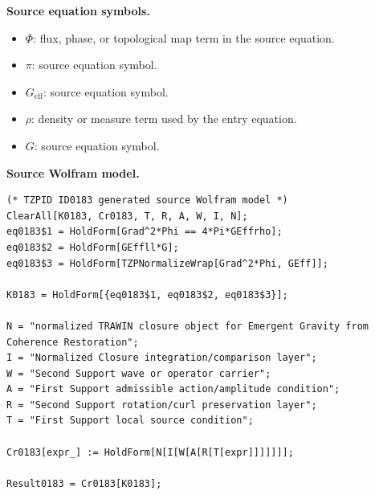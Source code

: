 \begin{minipage}[t]{0.49\linewidth}
\begingroup
\small
\raggedright
\textbf{Source equation symbols.}\par
\begin{itemize}[leftmargin=1.35em,itemsep=1pt,topsep=1pt,parsep=0pt]
    \item $\Phi$: flux, phase, or topological map term in the source equation.
    \item $\pi$: source equation symbol.
    \item $G_{\mathrm{eff}}$: source equation symbol.
    \item $\rho$: density or measure term used by the entry equation.
    \item $G$: source equation symbol.
\end{itemize}
\endgroup
\end{minipage}\hfill
\begin{minipage}[t]{0.47\linewidth}
\begingroup
\scriptsize
\raggedright
\textbf{Source Wolfram model.}\par
\begin{Verbatim}[fontsize=\tiny,breaklines=true,breakanywhere=true]
(* TZPID ID0183 generated source Wolfram model *)
ClearAll[K0183, Cr0183, T, R, A, W, I, N];
eq0183$1 = HoldForm[Grad^2*Phi == 4*Pi*GEffrho];
eq0183$2 = HoldForm[GEffll*G];
eq0183$3 = HoldForm[TZPNormalizeWrap[Grad^2*Phi, GEff]];

K0183 = HoldForm[{eq0183$1, eq0183$2, eq0183$3}];

N = "normalized TRAWIN closure object for Emergent Gravity from Coherence Restoration";
I = "Normalized Closure integration/comparison layer";
W = "Second Support wave or operator carrier";
A = "First Support admissible action/amplitude condition";
R = "Second Support rotation/curl preservation layer";
T = "First Support local source condition";

Cr0183[expr_] := HoldForm[N[I[W[A[R[T[expr]]]]]]];

Result0183 = Cr0183[K0183];
\end{Verbatim}
\endgroup
\end{minipage}

